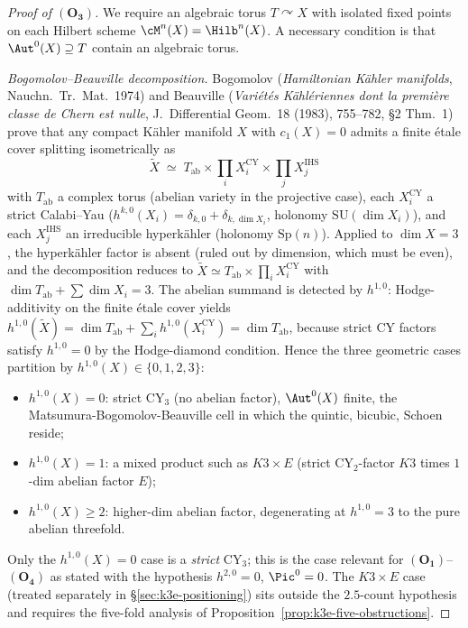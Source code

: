 \begin{proof}[Proof of $(\mathbf{O_3})$]
We require an algebraic torus $T \curvearrowright X$ with isolated
fixed points on each Hilbert scheme $\cM^n(X) = \Hilb^n(X)$. A necessary
condition is that $\Aut^0(X) \supseteq T$ contain an algebraic torus.

\emph{Bogomolov--Beauville decomposition.}
Bogomolov (\emph{Hamiltonian Kähler manifolds}, Nauchn.\ Tr.\ Mat.\
1974) and Beauville (\emph{Variétés Kählériennes dont la première
classe de Chern est nulle}, J.\ Differential Geom.\ 18 (1983), 755--782,
\S2 Thm.~1) prove that any compact Kähler manifold $X$ with $c_1(X) =
0$ admits a finite étale cover splitting isometrically as
\[
 \widetilde X \;\simeq\; T_\mathrm{ab} \times \prod_i X_i^{\mathrm{CY}}
 \times \prod_j X_j^{\mathrm{IHS}}
\]
with $T_\mathrm{ab}$ a complex torus (abelian variety in the projective
case), each $X_i^{\mathrm{CY}}$ a strict Calabi--Yau ($h^{k,0}(X_i)
= \delta_{k,0} + \delta_{k,\dim X_i}$, holonomy
$\mathrm{SU}(\dim X_i)$), and each $X_j^{\mathrm{IHS}}$ an
irreducible hyperkähler (holonomy $\mathrm{Sp}(n)$). Applied to
$\dim X = 3$, the hyperkähler factor is absent (ruled out by dimension,
which must be even), and the decomposition reduces to
$\widetilde X \simeq T_\mathrm{ab} \times \prod_i X_i^{\mathrm{CY}}$
with $\dim T_\mathrm{ab} + \sum\dim X_i = 3$. The abelian summand is
detected by $h^{1,0}$: Hodge-additivity on the finite étale cover
yields $h^{1,0}(\widetilde X) = \dim T_\mathrm{ab} + \sum_i
h^{1,0}(X_i^{\mathrm{CY}}) = \dim T_\mathrm{ab}$, because strict CY
factors satisfy $h^{1,0} = 0$ by the Hodge-diamond condition. Hence
the three geometric cases partition by $h^{1,0}(X) \in \{0, 1, 2, 3\}$:
\begin{itemize}[leftmargin=2em]
\item $h^{1,0}(X) = 0$: strict CY$_3$ (no abelian factor), $\Aut^0(X)$
 finite, the Matsumura-Bogomolov-Beauville cell in which the quintic,
 bicubic, Schoen reside;
\item $h^{1,0}(X) = 1$: a mixed product such as $K3 \times E$ (strict
 CY$_2$-factor $K3$ times $1$-dim abelian factor $E$);
\item $h^{1,0}(X) \geq 2$: higher-dim abelian factor, degenerating at
 $h^{1,0} = 3$ to the pure abelian threefold.
\end{itemize}
Only the $h^{1,0}(X) = 0$ case is a \emph{strict} CY$_3$; this is the
case relevant for $(\mathbf{O_1})$--$(\mathbf{O_4})$ as stated with the
hypothesis $h^{2,0} = 0$, $\Pic^0 = 0$. The $K3 \times E$ case
(treated separately in \S\ref{sec:k3e-positioning}) sits outside the
$2.5$-count hypothesis and requires the five-fold analysis of
Proposition~\ref{prop:k3e-five-obstructions}.


\end{proof}
